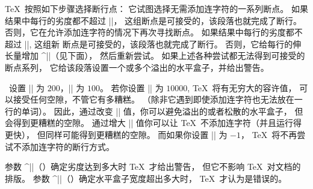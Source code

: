 \noindent \TeX\ 按照如下步骤选择断行点：
\olist
\li 它试图选择无需添加连字符的一系列断点。
如果结果中每行的劣度都不超过 |\pretolerance|，
这组断点是可接受的，该段落也就完成了断行。
\li 否则，它在允许添加连字符的情况下再次寻找断点。
如果结果中每行的劣度都不超过 |\tolerance|, 这组新
断点是可接受的，该段落也就完成了断行。
\li 否则，它给每行的伸长量增加 ^|\emergencystretch|（见下面），
然后重新尝试。
\li 如果上述各种尝试都无法得到可接受的断点系列，
它给该段落设置一个或多个溢出的水平盒子，并给出警告。
\endolist

\PlainTeX\ 设置 |\tolerance| 为 $200$，|\pretolerance| 为 $100$。
若你设置 |\tolerance| 为 $10000$, \TeX\ 将有无穷大的容许值，
可以接受任何空隙，不管它有多糟糕。%
（除非它遇到即使添加连字符也无法放在一行的单词）。
因此，通过改变 |\tolerance| 值，你可以避免溢出的或者松散的水平盒子，
但会得到更糟糕的空隙。
通过增大 |\pretolerance| 值你可以让 \TeX\ 不添加连字符（并且运行得更快），
但同样可能得到更糟糕的空隙。
而如果你设置 |\pretolerance| 为 $-1$，
\TeX\ 将不再尝试不添加连字符的断行方式。

参数 ^|\hbadness|（\xref \hbadness ）确定劣度达到多大时 \TeX\ 才给出警告，
但它不影响 \TeX\ 对文档的排版。
参数 ^|\hfuzz|（\xref \hfuzz ）确定水平盒子宽度超出多大时，
\TeX\ 才认为是错误的。
\enddesc

